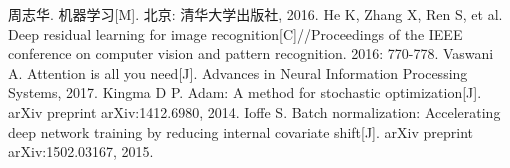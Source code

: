 \begin{thebibliography}{100}

周志华. 机器学习[M]. 北京: 清华大学出版社, 2016.
He K, Zhang X, Ren S, et al. Deep residual learning for image recognition[C]//Proceedings of the IEEE conference on computer vision and pattern recognition. 2016: 770-778.
Vaswani A. Attention is all you need[J]. Advances in Neural Information Processing Systems, 2017.
Kingma D P. Adam: A method for stochastic optimization[J]. arXiv preprint arXiv:1412.6980, 2014.
Ioffe S. Batch normalization: Accelerating deep network training by reducing internal covariate shift[J]. arXiv preprint arXiv:1502.03167, 2015.

\end{thebibliography}

